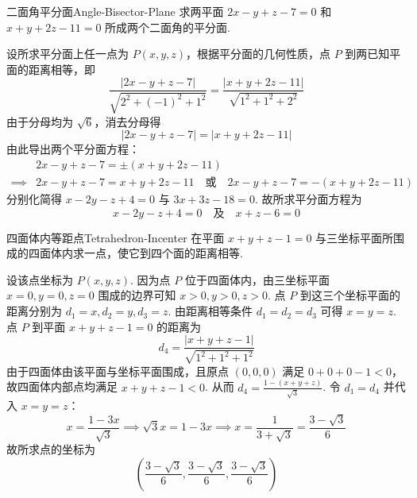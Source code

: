 \begin{problem}{二面角平分面}{Angle-Bisector-Plane}
    求两平面 $2x - y + z - 7 = 0$ 和 $x + y + 2z - 11 = 0$ 所成两个二面角的平分面.
\end{problem}

\begin{solution}
    设所求平分面上任一点为 $P(x, y, z)$，根据平分面的几何性质，点 $P$ 到两已知平面的距离相等，即
    \begin{equation*}
        \frac{|2x - y + z - 7|}{\sqrt{2^2 + (-1)^2 + 1^2}} = \frac{|x + y + 2z - 11|}{\sqrt{1^2 + 1^2 + 2^2}}
    \end{equation*}
    由于分母均为 $\sqrt{6}$，消去分母得
    \begin{equation*}
        |2x - y + z - 7| = |x + y + 2z - 11|
    \end{equation*}
    由此导出两个平分面方程：
    \begin{equation*}
        \begin{aligned}
                     & 2x - y + z - 7 = \pm(x + y + 2z - 11)                                                     \\
            \implies & 2x - y + z - 7 = x + y + 2z - 11 \quad \text{或} \quad 2x - y + z - 7 = -(x + y + 2z - 11)
        \end{aligned}
    \end{equation*}
    分别化简得 $x - 2y - z + 4 = 0$ 与 $3x + 3z - 18 = 0$.
    故所求平分面方程为
    \begin{equation*}
        \boxed{x - 2y - z + 4 = 0 \quad \text{及} \quad x + z - 6 = 0}
    \end{equation*}
\end{solution}

\begin{problem}{四面体内等距点}{Tetrahedron-Incenter}
    在平面 $x + y + z - 1 = 0$ 与三坐标平面所围成的四面体内求一点，使它到四个面的距离相等.
\end{problem}

\begin{solution}
    设该点坐标为 $P(x, y, z)$. 因为点 $P$ 位于四面体内，由三坐标平面 $x=0, y=0, z=0$ 围成的边界可知 $x > 0, y > 0, z > 0$.
    点 $P$ 到这三个坐标平面的距离分别为 $d_1 = x, d_2 = y, d_3 = z$.
    由距离相等条件 $d_1 = d_2 = d_3$ 可得 $x = y = z$.
    点 $P$ 到平面 $x + y + z - 1 = 0$ 的距离为
    \begin{equation*}
        d_4 = \frac{|x + y + z - 1|}{\sqrt{1^2 + 1^2 + 1^2}}
    \end{equation*}
    由于四面体由该平面与坐标平面围成，且原点 $(0,0,0)$ 满足 $0+0+0-1 < 0$，故四面体内部点均满足 $x + y + z - 1 < 0$.
    从而 $d_4 = \frac{1 - (x + y + z)}{\sqrt{3}}$. 令 $d_1 = d_4$ 并代入 $x = y = z$：
    \begin{equation*}
        x = \frac{1 - 3x}{\sqrt{3}} \implies \sqrt{3}x = 1 - 3x \implies x = \frac{1}{3 + \sqrt{3}} = \frac{3 - \sqrt{3}}{6}
    \end{equation*}
    故所求点的坐标为
    \begin{equation*}
        \boxed{\left( \frac{3 - \sqrt{3}}{6}, \frac{3 - \sqrt{3}}{6}, \frac{3 - \sqrt{3}}{6} \right)}
    \end{equation*}
\end{solution}



